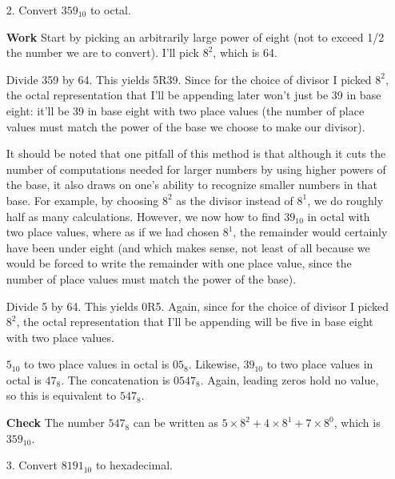 \documentclass[12pt]{article}
\begin{document}
\begin{enumerate}
\item[2.] Convert $359_{10}$ to octal.
\end{enumerate}

\begin{enumerate}
  \item[\textbf{Work}] Start by picking an arbitrarily large power of eight (not to exceed 1/2 the number we are to convert). I'll pick $8^2$, which is 64.
  \item[] Divide 359 by 64. This yields 5R39. Since for the choice of divisor I picked $8^2$, the octal representation that I'll be appending later won't just be 39 in base eight: it'll be 39 in base eight with two place values (the number of place values must match the power of the base we choose to make our divisor).
  \item[] It should be noted that one pitfall of this method is that although it cuts the number of computations needed for larger numbers by using higher powers of the base, it also draws on one's ability to recognize smaller numbers in that base. For example, by choosing $8^2$ as the divisor instead of $8^1$, we do roughly half as many calculations. However, we now how to find $39_{10}$ in octal with two place values, where as if we had chosen $8^1$, the remainder would certainly have been under eight (and which makes sense, not least of all because we would be forced to write the remainder with one place value, since the number of place values must match the power of the base).
  \item[] Divide 5 by 64. This yields 0R5. Again, since for the choice of divisor I picked $8^2$, the octal representation that I'll be appending will be five in base eight with two place values.
  \item[] $5_{10}$ to two place values in octal is $05_8$. Likewise, $39_{10}$ to two place values in octal is $47_8$. The concatenation is $0547_8$. Again, leading zeros hold no value, so this is equivalent to $547_8$.
  \item[\textbf{Check}] The number $547_8$ can be written as $5\times8^{2}+4\times8^1+7\times8^0$, which is $359_{10}$.
\end{enumerate}

\begin{enumerate}
\item[3.] Convert $8191_{10}$ to hexadecimal.
\end{enumerate}
\end{document}

